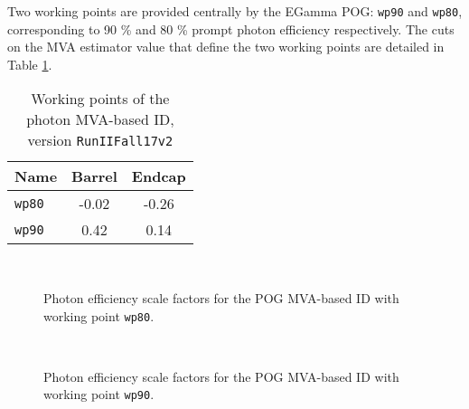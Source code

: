 Two working points are provided centrally by the EGamma POG: \texttt{wp90} and \texttt{wp80}, corresponding to 90 \% and 80 \% prompt photon efficiency respectively.
The cuts on the MVA estimator value that define the two working points are detailed in Table \ref{tab:MVAwpCuts}.

\begin{table}[ht]
\caption[.]{Working points of the photon MVA-based ID, version \texttt{RunIIFall17v2}}
\label{tab:MVAwpCuts}
\centering
\begin{tabular}{|l|c|c|}
\hline
Name & Barrel & Endcap \\
\hline
\texttt{wp80} & -0.02 & -0.26 \\
\texttt{wp90} &  0.42 &  0.14 \\
\hline
\end{tabular}
\end{table}

\begin{figure}
\begin{center}
%
\\
\end{center}
\caption{Photon efficiency scale factors for the POG MVA-based ID with working point \texttt{wp80}.}
\label{fig:phEffMVASF_wp80}
\end{figure}

\begin{figure}
\centering
{}%
\\
\caption{Photon efficiency scale factors for the POG MVA-based ID with working point \texttt{wp90}.}
\label{fig:phEffMVASF_wp90}
\end{figure}
